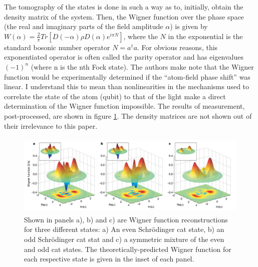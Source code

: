 The tomography of the states is done in such a way as to, initially, obtain the density matrix of the system. Then, the Wigner function over the phase space (the real and imaginary parts of the field amplitude $\alpha$) is given by $W(\alpha)=\frac{2}{\pi}Tr[D(-\alpha)\rho D(\alpha)e^{i\pi N}]$, where the $N$ in the exponential is the standard bosonic number operator $N = a^\dagger a$. For obvious reasons, this exponentiated operator is often called the parity operator and has eigenvalues $(-1)^n$ (where n is the nth Fock state). The authors make note that the Wigner function would be experimentally determined if the ``atom-field phase shift'' was linear. I understand this to mean than nonlinearities in the mechanisms used to correlate the state of the atom (qubit) to that of the light make a direct determination of the Wigner function impossible. The results of measurement, post-processed, are shown in figure \ref{DelMeasurements}. The density matrices are not shown out of their irrelevance to this paper.


\begin{figure}%
\includegraphics[width=440px,height=149px]{Figures/DelMeasurements.png}%
\caption{Shown in panels a), b) and c) are Wigner function reconstructions for three different states: a) An even Schr\"odinger cat state, b) an odd Schr\"odinger cat stat and c) a symmetric mixture of the even and odd cat states. The theoretically-predicted Wigner function for each respective state is given in the inset of each panel.}%
\label{DelMeasurements}%
\end{figure}

